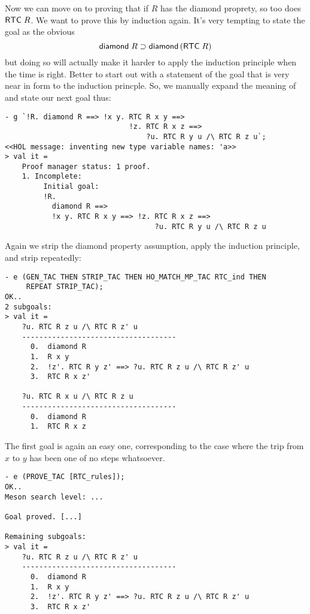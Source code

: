 \documentclass[12pt]{article}
\begin{document}
Now we can move on to proving that if $R$ has the diamond proprety, so
too does ${\sf RTC}\;R$.  We want to prove this by induction again.
It's very tempting to state the goal as the obvious \[
{\sf diamond}\;R\supset{\sf diamond}\,({\sf RTC}\;R)
\] but doing so will actually make it harder to apply the induction
principle when the time is right.  Better to start out with a
statement of the goal that is very near in form to the induction
princple.  So, we manually expand the meaning of  and state
our next goal thus:
\begin{session}\begin{verbatim}
- g `!R. diamond R ==> !x y. RTC R x y ==>
                             !z. RTC R x z ==>
                                 ?u. RTC R y u /\ RTC R z u`;
<<HOL message: inventing new type variable names: 'a>>
> val it =
    Proof manager status: 1 proof.
    1. Incomplete:
         Initial goal:
         !R.
           diamond R ==>
           !x y. RTC R x y ==> !z. RTC R x z ==>
                                   ?u. RTC R y u /\ RTC R z u
\end{verbatim}\end{session}
    Again we strip the diamond property assumption, apply the
    induction principle, and strip repeatedly:
\begin{session}\begin{verbatim}
- e (GEN_TAC THEN STRIP_TAC THEN HO_MATCH_MP_TAC RTC_ind THEN
     REPEAT STRIP_TAC);
OK..
2 subgoals:
> val it =
    ?u. RTC R z u /\ RTC R z' u
    ------------------------------------
      0.  diamond R
      1.  R x y
      2.  !z'. RTC R y z' ==> ?u. RTC R z u /\ RTC R z' u
      3.  RTC R x z'

    ?u. RTC R x u /\ RTC R z u
    ------------------------------------
      0.  diamond R
      1.  RTC R x z
\end{verbatim}\end{session}
The first goal is again an easy one, corresponding to the case where
the trip from $x$ to $y$ has been one of no steps whatsoever.
\begin{session}\begin{verbatim}
- e (PROVE_TAC [RTC_rules]);
OK..
Meson search level: ...

Goal proved. [...]

Remaining subgoals:
> val it =
    ?u. RTC R z u /\ RTC R z' u
    ------------------------------------
      0.  diamond R
      1.  R x y
      2.  !z'. RTC R y z' ==> ?u. RTC R z u /\ RTC R z' u
      3.  RTC R x z'
\end{verbatim}\end{session}
\end{document}
